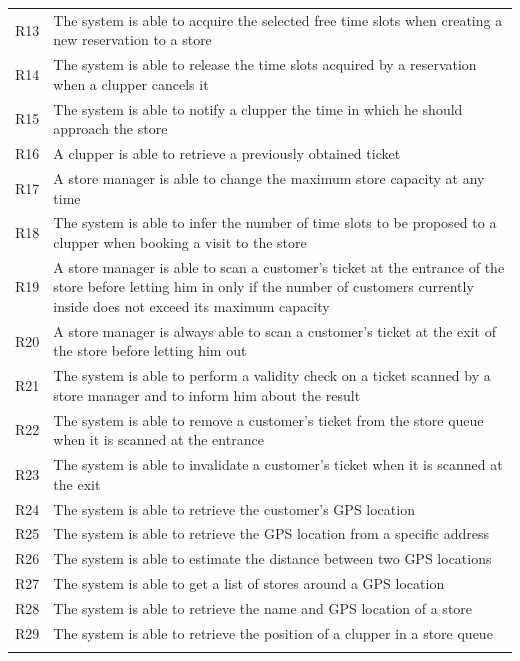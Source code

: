 \begin{longtable}[]{@{}
  >{\raggedright\arraybackslash}p{}
  >{\raggedright\arraybackslash}p{}@{}}
R13 & The system is able to acquire the selected free time slots when
creating a new reservation to a store \\ \addlinespace
R14 & The system is able to release the time slots acquired by a
reservation when a clupper cancels it \\ \addlinespace
R15 & The system is able to notify a clupper the time in which he should
approach the store \\ \addlinespace
R16 & A clupper is able to retrieve a previously obtained
ticket \\ \addlinespace
R17 & A store manager is able to change the maximum store capacity at
any time \\ \addlinespace
R18 & The system is able to infer the number of time slots to be
proposed to a clupper when booking a visit to the store \\ \addlinespace
R19 & A store manager is able to scan a customer's ticket at the
entrance of the store before letting him in only if the number of
customers currently inside does not exceed its maximum
capacity \\ \addlinespace
R20 & A store manager is always able to scan a customer's ticket at the
exit of the store before letting him out \\ \addlinespace
R21 & The system is able to perform a validity check on a ticket scanned
by a store manager and to inform him about the result \\ \addlinespace
R22 & The system is able to remove a customer's ticket from the store
queue when it is scanned at the entrance \\ \addlinespace
R23 & The system is able to invalidate a customer's ticket when it is
scanned at the exit \\ \addlinespace
R24 & The system is able to retrieve the customer's GPS
location \\ \addlinespace
R25 & The system is able to retrieve the GPS location from a specific
address \\ \addlinespace
R26 & The system is able to estimate the distance between two GPS
locations \\ \addlinespace
R27 & The system is able to get a list of stores around a GPS
location \\ \addlinespace
R28 & The system is able to retrieve the name and GPS location of a
store \\ \addlinespace
R29 & The system is able to retrieve the position of a clupper in a
store queue \\ \addlinespace

\end{longtable}
